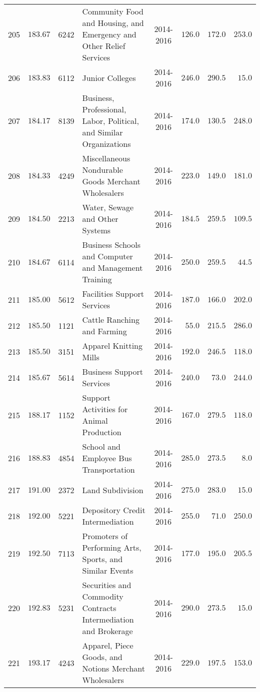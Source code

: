 \documentclass[9pt, oneside]{article}   	%
\begin{document}
\begin{longtable}{cccp{2.0in}cccc}
205  & $183.67$ & 6242 & Community Food and Housing, and Emergency and Other Relief Services & 2014-2016 & $126.0$ & $172.0$ & $253.0$ \\
206  & $183.83$ & 6112 & Junior Colleges & 2014-2016 & $246.0$ & $290.5$ & $\phantom{0}15.0$ \\
207  & $184.17$ & 8139 & Business, Professional, Labor, Political, and Similar Organizations & 2014-2016 & $174.0$ & $130.5$ & $248.0$ \\
208  & $184.33$ & 4249 & Miscellaneous Nondurable Goods Merchant Wholesalers & 2014-2016 & $223.0$ & $149.0$ & $181.0$ \\
209  & $184.50$ & 2213 & Water, Sewage and Other Systems & 2014-2016 & $184.5$ & $259.5$ & $109.5$ \\
210  & $184.67$ & 6114 & Business Schools and Computer and Management Training & 2014-2016 & $250.0$ & $259.5$ & $\phantom{0}44.5$ \\
211  & $185.00$ & 5612 & Facilities Support Services & 2014-2016 & $187.0$ & $166.0$ & $202.0$ \\
212  & $185.50$ & 1121 & Cattle Ranching and Farming & 2014-2016 & $\phantom{0}55.0$ & $215.5$ & $286.0$ \\
213  & $185.50$ & 3151 & Apparel Knitting Mills & 2014-2016 & $192.0$ & $246.5$ & $118.0$ \\
214  & $185.67$ & 5614 & Business Support Services & 2014-2016 & $240.0$ & $\phantom{0}73.0$ & $244.0$ \\
215  & $188.17$ & 1152 & Support Activities for Animal Production & 2014-2016 & $167.0$ & $279.5$ & $118.0$ \\
216  & $188.83$ & 4854 & School and Employee Bus Transportation & 2014-2016 & $285.0$ & $273.5$ & $\phantom{00}8.0$ \\
217  & $191.00$ & 2372 & Land Subdivision & 2014-2016 & $275.0$ & $283.0$ & $\phantom{0}15.0$ \\
218  & $192.00$ & 5221 & Depository Credit Intermediation & 2014-2016 & $255.0$ & $\phantom{0}71.0$ & $250.0$ \\
219  & $192.50$ & 7113 & Promoters of Performing Arts, Sports, and Similar Events & 2014-2016 & $177.0$ & $195.0$ & $205.5$ \\
220  & $192.83$ & 5231 & Securities and Commodity Contracts Intermediation and Brokerage & 2014-2016 & $290.0$ & $273.5$ & $\phantom{0}15.0$ \\
221  & $193.17$ & 4243 & Apparel, Piece Goods, and Notions Merchant Wholesalers & 2014-2016 & $229.0$ & $197.5$ & $153.0$ \\

\end{longtable}
\end{document}
